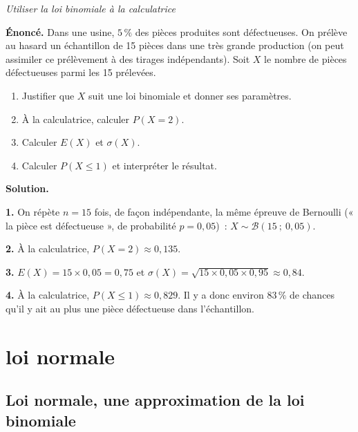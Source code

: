\documentclass[11pt,a4paper]{article}
\begin{document}
\begin{exo}
\textit{Utiliser la loi binomiale à la calculatrice}
\medskip

\textbf{Énoncé.} Dans une usine, $5\,\%$ des pièces produites sont défectueuses. On prélève au hasard un échantillon de 15 pièces dans une très grande production (on peut assimiler ce prélèvement à des tirages indépendants). Soit $X$ le nombre de pièces défectueuses parmi les 15 prélevées.
\begin{enumerate}[leftmargin=6mm]
\item Justifier que $X$ suit une loi binomiale et donner ses paramètres.
\item À la calculatrice, calculer $P(X=2)$.
\item Calculer $E(X)$ et $\sigma(X)$.
\item Calculer $P(X \leqslant 1)$ et interpréter le résultat.
\end{enumerate}

\textbf{Solution.}

\textbf{1.} On répète $n=15$ fois, de façon indépendante, la même épreuve de Bernoulli (« la pièce est défectueuse », de probabilité $p=0{,}05$)~: $X \sim \mathcal{B}(15~;~0{,}05)$.

\textbf{2.} À la calculatrice, $P(X=2) \approx 0{,}135$.

\textbf{3.} $E(X) = 15 \times 0{,}05 = 0{,}75$ et $\sigma(X) = \sqrt{15\times0{,}05\times0{,}95} \approx 0{,}84$.

\textbf{4.} À la calculatrice, $P(X \leqslant 1) \approx 0{,}829$. Il y a donc environ $83\,\%$ de chances qu'il y ait au plus une pièce défectueuse dans l'échantillon.
\end{exo}

\section{loi normale}

\subsection{Loi normale, une approximation de la loi binomiale}
\end{document}
